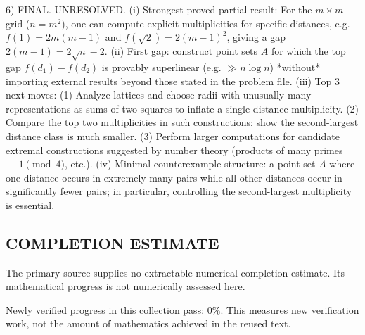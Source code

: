 6) FINAL.
UNRESOLVED.
(i) Strongest proved partial result: For the $m\times m$ grid ($n=m^2$), one can compute explicit multiplicities for specific distances, e.g. $f(1)=2m(m-1)$ and $f(\sqrt{2})=2(m-1)^2$, giving a gap $2(m-1)=2\sqrt{n}-2$.
(ii) First gap: construct point sets $A$ for which the top gap $f(d_1)-f(d_2)$ is provably superlinear (e.g. $\gg n\log n$) *without* importing external results beyond those stated in the problem file.
(iii) Top 3 next moves:
  (1) Analyze lattices and choose radii with unusually many representations as sums of two squares to inflate a single distance multiplicity.
  (2) Compare the top two multiplicities in such constructions: show the second-largest distance class is much smaller.
  (3) Perform larger computations for candidate extremal constructions suggested by number theory (products of many primes $\equiv 1\pmod 4$, etc.).
(iv) Minimal counterexample structure: a point set $A$ where one distance occurs in extremely many pairs while all other distances occur in significantly fewer pairs; in particular, controlling the second-largest multiplicity is essential.




\subsection*{COMPLETION ESTIMATE}
The primary source supplies no extractable numerical completion estimate. Its mathematical progress is not numerically assessed here.

Newly verified progress in this collection pass: $0\%$. This measures new verification work, not the amount of mathematics achieved in the reused text.
